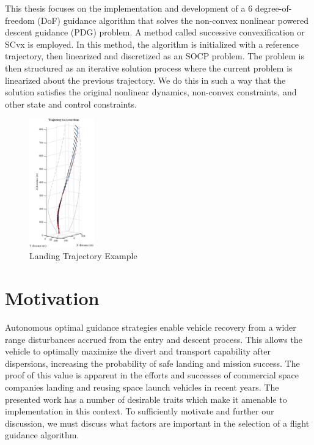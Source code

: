 This thesis focuses on the implementation and development of a 6 degree-of-freedom (DoF) guidance algorithm that solves the non-convex nonlinear powered descent guidance (PDG) problem. A method called successive convexification or SCvx is employed. In this method, the algorithm is initialized with a reference trajectory, then linearized and discretized as an SOCP problem. The problem is then structured as an iterative solution process where the current problem is linearized about the previous trajectory. We do this in such a way that the solution satisfies the original nonlinear dynamics, non-convex constraints, and other state and control constraints. 
\begin{figure}[!htbp] 
  \centering
  \includegraphics[width=0.25\textwidth]{figs/3dtraj_intro.eps}
  \caption{Landing Trajectory Example}
  \label{fig:intro}
 \end{figure}	



\section{Motivation}
Autonomous optimal guidance strategies enable vehicle recovery from a wider range disturbances accrued from the entry and descent process. This allows the vehicle to optimally maximize the divert and transport capability after dispersions, increasing the probability of safe landing and mission success. The proof of this value is apparent in the efforts and successes of commercial space companies landing and reusing space launch vehicles in recent years. The presented work has a number of desirable traits which make it amenable to implementation in this context. To sufficiently motivate and further our discussion, we must discuss what factors are important in the selection of a flight guidance algorithm.



